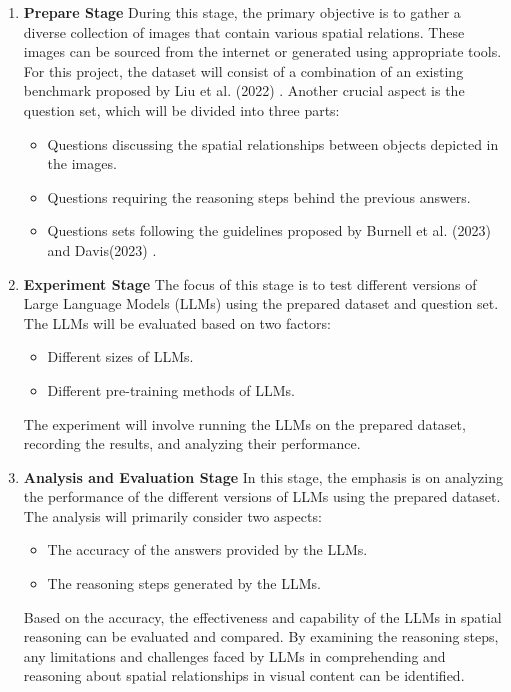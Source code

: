 \documentclass[twocolumn,11pt]{report}
\begin{document}
\begin{enumerate}
    \item \textbf{Prepare Stage}
    \subitem During this stage, the primary objective is to gather a diverse collection of images that contain various spatial relations. These images can be sourced from the internet or generated using appropriate tools. For this project, the dataset will consist of a combination of an existing benchmark proposed by Liu et al. (2022) \cite{liu2022visual}.
    Another crucial aspect is the question set, which will be divided into three parts:
    \begin{itemize}
        \item Questions discussing the spatial relationships between objects depicted in the images.
        \item Questions requiring the reasoning steps behind the previous answers.
        \item Questions sets following the guidelines proposed by Burnell et al. (2023) and Davis(2023) \cite{burnell2023rethink,davis2023benchmarks}.
    \end{itemize}
    \item \textbf{Experiment Stage}
    \subitem The focus of this stage is to test different versions of Large Language Models (LLMs) using the prepared dataset and question set. The LLMs will be evaluated based on two factors:
    \begin{itemize}
        \item Different sizes of LLMs.
        \item Different pre-training methods of LLMs.
    \end{itemize}
    The experiment will involve running the LLMs on the prepared dataset, recording the results, and analyzing their performance.
    \item \textbf{Analysis and Evaluation Stage}
    \subitem In this stage, the emphasis is on analyzing the performance of the different versions of LLMs using the prepared dataset. The analysis will primarily consider two aspects:
    \begin{itemize}
        \item The accuracy of the answers provided by the LLMs.
        \item The reasoning steps generated by the LLMs.
    \end{itemize}
    Based on the accuracy, the effectiveness and capability of the LLMs in spatial reasoning can be evaluated and compared. By examining the reasoning steps, any limitations and challenges faced by LLMs in comprehending and reasoning about spatial relationships in visual content can be identified.
\end{enumerate}
\end{document}
